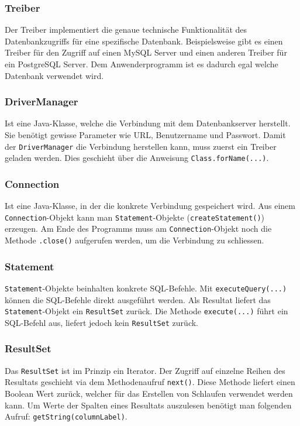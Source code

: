 \subsubsection{Treiber}
Der Treiber implementiert die genaue technische Funktionalität des Datenbankzugriffs für eine spezifische Datenbank. Beispielsweise gibt es einen Treiber für den Zugriff auf einen MySQL Server und einen anderen Treiber für ein PostgreSQL Server. Dem Anwenderprogramm ist es dadurch egal welche Datenbank verwendet wird.

\subsubsection{DriverManager}
Ist eine Java-Klasse, welche die Verbindung mit dem Datenbankserver herstellt. Sie benötigt gewisse Parameter wie URL, Benutzername und Passwort. Damit der \texttt{DriverManager} die Verbindung herstellen kann, muss zuerst ein Treiber geladen werden. Dies geschieht über die Anweisung \texttt{Class.forName(...)}.

\subsubsection{Connection}
Ist eine Java-Klasse, in der die konkrete Verbindung gespeichert wird. Aus einem \texttt{Connection}-Objekt kann man \texttt{Statement}-Objekte (\texttt{createStatement()}) erzeugen. Am Ende des Programms muss am \texttt{Connection}-Objekt noch die Methode \texttt{.close()} aufgerufen werden, um die Verbindung zu schliessen.

\subsubsection{Statement}
\texttt{Statement}-Objekte beinhalten konkrete SQL-Befehle. Mit \texttt{executeQuery(...)} können die SQL-Befehle direkt ausgeführt werden. Als Resultat liefert das \texttt{Statement}-Objekt ein \texttt{ResultSet} zurück. Die Methode \texttt{execute(...)} führt ein SQL-Befehl aus, liefert jedoch kein \texttt{ResultSet} zurück.

\subsubsection{ResultSet}
Das \texttt{ResultSet} ist im Prinzip ein Iterator. Der Zugriff auf einzelne Reihen des Resultats geschieht via dem Methodenaufruf \texttt{next()}. Diese Methode liefert einen Boolean Wert zurück, welcher für das Erstellen von Schlaufen verwendet werden kann. Um Werte der Spalten eines Resultats auszulesen benötigt man folgenden Aufruf: \texttt{getString(columnLabel)}. 

